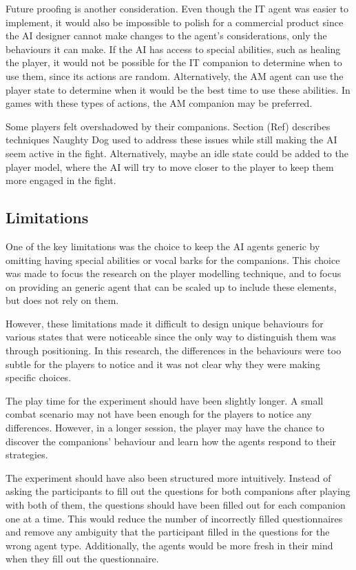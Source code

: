 \documentclass{IEEEtran}
\begin{document}
Future proofing is another consideration. Even though the IT agent was easier to implement, it would also be impossible to polish for a commercial product since the AI designer cannot make changes to the agent’s considerations, only the behaviours it can make. If the AI has access to special abilities, such as healing the player, it would not be possible for the IT companion to determine when to use them, since its actions are random. Alternatively, the AM agent can use the player state to determine when it would be the best time to use these abilities. In games with these types of actions, the AM companion may be preferred.

Some players felt overshadowed by their companions. Section (Ref) describes techniques Naughty Dog used to address these issues while still making the AI seem active in the fight. Alternatively, maybe an idle state could be added to the player model, where the AI will try to move closer to the player to keep them more engaged in the fight.

\subsection{Limitations}
\label{Limitations}

One of the key limitations was the choice to keep the AI agents generic by omitting having special abilities or vocal barks for the companions. This choice was made to focus the research on the player modelling technique, and to focus on providing an generic agent that can be scaled up to include these elements, but does not rely on them.

However, these limitations made it difficult to design unique behaviours for various states that were noticeable since the only way to distinguish them was through positioning. In this research, the differences in the behaviours were too subtle for the players to notice and it was not clear why they were making specific choices.

The play time for the experiment should have been slightly longer. A small combat scenario may not have been enough for the players to notice any differences. However, in a longer session, the player may have the chance to discover the companions’ behaviour and learn how the agents respond to their strategies.

The experiment should have also been structured more intuitively. Instead of asking the participants to fill out the questions for both companions after playing with both of them, the questions should have been filled out for each companion one at a time. This would reduce the number of incorrectly filled questionnaires and remove any ambiguity that the participant filled in the questions for the wrong agent type. Additionally, the agents would be more fresh in their mind when they fill out the questionnaire.
\end{document}
